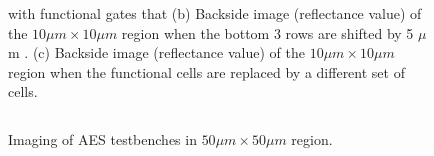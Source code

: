 \documentclass{beamer}
\begin{document}
\begin{columns}
\begin{column}[T]{0.33\textwidth}
\begin{figure}[t]
\begin{columns}
{                        with functional gates that (b) Backside image (reflectance value) of the
                        $10\mu m \times 10\mu m$ region when the bottom 3 rows
                        are shifted by 5 $\mu$m .  
                        (c) Backside image (reflectance
                        value) of the $10\mu m \times 10\mu m$ region when the
                        functional cells are replaced by a different set of
                        cells.
                        }
                    \end{columns}
                \end{figure} 
                \begin{figure}[h]
                     \centering
                     \caption{
                         Imaging of AES testbenches in $50\mu m \times 50\mu m $
                         region.
                         }
                     \label{imaging_result}
                 \end{figure}
                \begin{figure}[ht]
                    \begin{center}

\end{center}
\end{figure}
\end{column}
\end{columns}
\end{document}
